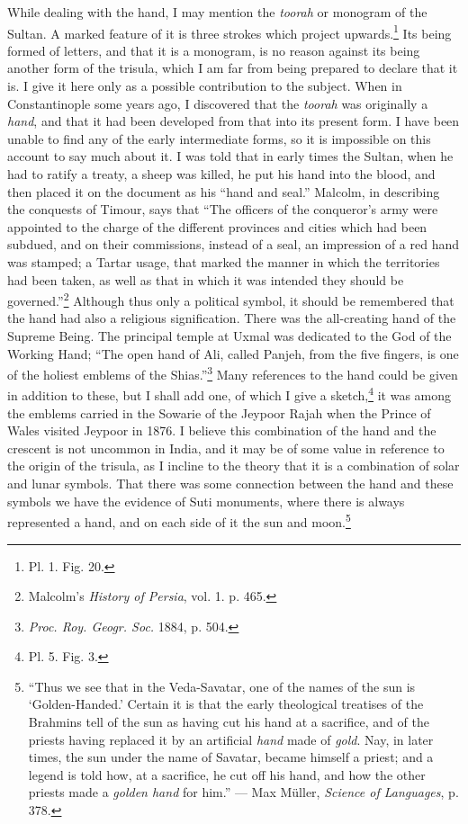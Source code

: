 \documentclass[a4paper, 11pt, oneside, english]{article}
\begin{document}
While dealing with the hand, I may mention the \emph{toorah} or monogram of the Sultan. A marked feature of it is three strokes which project upwards.\footnote{Pl. 1. Fig. 20.} Its being formed of letters, and that it is a monogram, is no reason against its being another form of the trisula, which I am far from being prepared to declare that it is. I give it here only as a possible contribution to the subject. When in Constantinople some years ago, I discovered that the \emph{toorah} was originally a \emph{hand}, and that it had been developed from that into its present form. I have been unable to find any of the early intermediate forms, so it is impossible on this account to say much about it. I was told that in early times the Sultan, when he had to ratify a treaty, a sheep was killed, he put his hand into the blood, and then placed it on the document as his ``hand and seal.'' Malcolm, in describing the conquests of Timour, says that ``The officers of the conqueror's army were appointed to the charge of the different provinces and cities which had been subdued, and on their commissions, instead of a seal, an impression of a red hand was stamped; a Tartar usage, that marked the manner in which the territories had been taken, as well as that in which it was intended they should be governed.''\footnote{Malcolm's \emph{History of Persia}, vol. 1. p. 465.} Although thus only a political symbol, it should be remembered that the hand had also a religious signification. There was the all-creating hand of the Supreme Being. The principal temple at Uxmal was dedicated to the God of the Working Hand; ``The open hand of Ali, called Panjeh, from the five fingers, is one of the holiest emblems of the Shias.''\footnote{\emph{Proc. Roy. Geogr. Soc.} 1884, p. 504.} Many references to the hand could be given in addition to these, but I shall add one, of which I give a sketch,\footnote{Pl. 5. Fig. 3.} it was among the emblems carried in the Sowarie of the Jeypoor Rajah when the Prince of Wales visited Jeypoor in 1876. I believe this combination of the hand and the crescent is not uncommon in India, and it may be of some value in reference to the origin of the trisula, as I incline to the theory that it is a combination of solar and lunar symbols. That there was some connection between the hand and these symbols we have the evidence of Suti monuments, where there is always represented a hand, and on each side of it the sun and moon.\footnote{``Thus we see that in the Veda-Savatar, one of the names of the sun is `Golden-Handed.' Certain it is that the early theological treatises of the Brahmins tell of the sun as having cut his hand at a sacrifice, and of the priests having replaced it by an artificial \emph{hand} made of \emph{gold}. Nay, in later times, the sun under the name of Savatar, became himself a priest; and a legend is told how, at a sacrifice, he cut off his hand, and how the other priests made a \emph{golden hand} for him.'' --- Max Müller, \emph{Science of Languages}, p. 378.}
\end{document}
